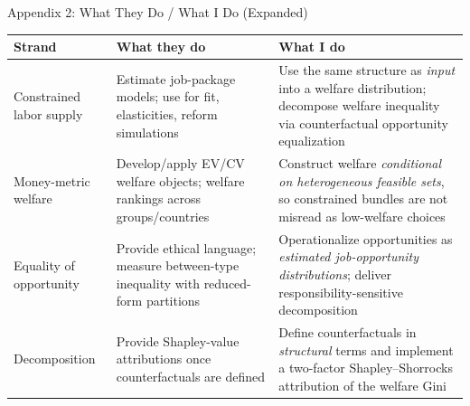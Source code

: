 \documentclass[aspectratio=169,11pt]{beamer}
\begin{document}
\begin{frame}{Appendix 2: What They Do / What I Do (Expanded)}

\scriptsize
\begin{tabular}{@{}>{\raggedright}p{2.2cm} >{\raggedright}p{4.0cm} >{\raggedright\arraybackslash}p{4.8cm}@{}}
\toprule
\textbf{Strand} & \textbf{What they do} & \textbf{What I do} \\
\midrule
Constrained labor supply
& Estimate job-package models; use for fit, elasticities, reform simulations
& Use the same structure as \emph{input} into a welfare distribution; decompose welfare inequality via counterfactual opportunity equalization \\[4pt]
Money-metric welfare
& Develop/apply EV/CV welfare objects; welfare rankings across groups/countries
& Construct welfare \emph{conditional on heterogeneous feasible sets}, so constrained bundles are not misread as low-welfare choices \\[4pt]
Equality of opportunity
& Provide ethical language; measure between-type inequality with reduced-form partitions
& Operationalize opportunities as \emph{estimated job-opportunity distributions}; deliver responsibility-sensitive decomposition \\[4pt]
Decomposition
& Provide Shapley-value attributions once counterfactuals are defined
& Define counterfactuals in \emph{structural} terms and implement a two-factor Shapley--Shorrocks attribution of the welfare Gini \\
\bottomrule
\end{tabular}
\end{frame}
\end{document}
